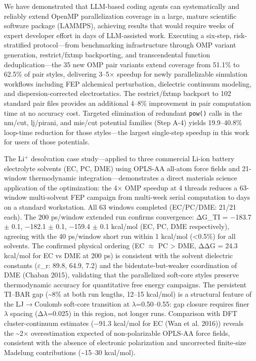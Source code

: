 \documentclass[
  11pt,
]{article}
\begin{document}
We have demonstrated that LLM-based coding agents can systematically and
reliably extend OpenMP parallelization coverage in a large, mature
scientific software package (LAMMPS), achieving results that would
require weeks of expert developer effort in days of LLM-assisted work.
Executing a six-step, risk-stratified protocol---from benchmarking
infrastructure through OMP variant generation, restrict/fxtmp
backporting, and transcendental function deduplication---the 35 new OMP
pair variants extend coverage from 51.1\% to 62.5\% of pair styles,
delivering 3--5\(\times\) speedup for newly parallelizable simulation
workflows including FEP alchemical perturbation, dielectric continuum
modeling, and dispersion-corrected electrostatics. The restrict/fxtmp
backport to 102 standard pair files provides an additional 4--8\%
improvement in pair computation time at no accuracy cost. Targeted
elimination of redundant \texttt{pow()} calls in the nm/cut, lj/pirani,
and mie/cut potential families (Step A-4) yields 19.9--40.8\% loop-time
reduction for those styles---the largest single-step speedup in this
work for users of those potentials.

The Li\(^{+}\) desolvation case study---applied to three commercial
Li-ion battery electrolyte solvents (EC, PC, DME) using OPLS-AA all-atom
force fields and 21-window thermodynamic integration---demonstrates a
direct materials science application of the optimization: the
4\(\times\) OMP speedup at 4 threads reduces a 63-window multi-solvent
FEP campaign from multi-week serial computation to days on a standard
workstation. All 63 windows completed (EC/PC/DME: 21/21 each). The 200
ps/window extended run confirms convergence: ΔG\_TI = −183.7 \(\pm\)
0.1, −182.1 \(\pm\) 0.1, −159.4 \(\pm\) 0.1 kcal/mol (EC, PC, DME
respectively), agreeing with the 40 ps/window short run within 1
kcal/mol (\textless0.5\%) for all solvents. The confirmed physical
ordering (EC \(\approx\) PC \textgreater{} DME, ΔΔG = 24.3 kcal/mol for
EC vs DME at 200 ps) is consistent with the solvent dielectric constants
(\(\varepsilon\)\_r: 89.8, 64.9, 7.2) and the bidentate-but-weaker
coordination of DME (Chaban 2015), validating that the parallelized
soft-core styles preserve thermodynamic accuracy for quantitative free
energy campaigns. The persistent TI--BAR gap (\textasciitilde8\% at both
run lengths, 12--15 kcal/mol) is a structural feature of the
LJ\(\rightarrow\)Coulomb soft-core transition at \(\lambda\)=0.50--0.55:
gap closure requires finer \(\lambda\) spacing (Δ\(\lambda\)=0.025) in
this region, not longer runs. Comparison with DFT cluster-continuum
estimates (−91.3 kcal/mol for EC ({Wan et al.} 2016)) reveals the
\textasciitilde2\(\times\) overestimation expected of non-polarizable
OPLS-AA force fields, consistent with the absence of electronic
polarization and uncorrected finite-size Madelung contributions
(\textasciitilde15--30 kcal/mol).
\end{document}

